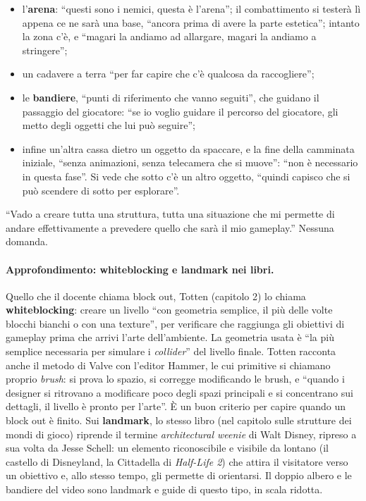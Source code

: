 \begin{itemize}
        spaccato, landmark ``importante per la resa estetica della scena'';
  \item l'\textbf{arena}: ``questi sono i nemici, questa è l'arena''; il combattimento si
        testerà lì appena ce ne sarà una base, ``ancora prima di avere la parte
        estetica''; intanto la zona c'è, e ``magari la andiamo ad allargare, magari la
        andiamo a stringere'';
  \item un cadavere a terra ``per far capire che c'è qualcosa da raccogliere'';
  \item le \textbf{bandiere}, ``punti di riferimento che vanno seguiti'', che guidano il
        passaggio del giocatore: ``se io voglio guidare il percorso del giocatore, gli
        metto degli oggetti che lui può seguire'';
  \item infine un'altra cassa dietro un oggetto da spaccare, e la fine della camminata
        iniziale, ``senza animazioni, senza telecamera che si muove'': ``non è necessario in
        questa fase''. Si vede che sotto c'è un altro oggetto, ``quindi capisco che si può
        scendere di sotto per esplorare''.
\end{itemize}
``Vado a creare tutta una struttura, tutta una situazione che mi permette di andare
effettivamente a prevedere quello che sarà il mio gameplay.'' Nessuna domanda.

\paragraph{Approfondimento: whiteblocking e landmark nei libri.} Quello che il docente
chiama block out, Totten (capitolo 2) lo chiama \textbf{whiteblocking}: creare un livello
``con geometria semplice, il più delle volte blocchi bianchi o con una texture'', per
verificare che raggiunga gli obiettivi di gameplay prima che arrivi l'arte
dell'ambiente. La geometria usata è ``la più semplice necessaria per simulare i
\emph{collider}'' del livello finale. Totten racconta anche il metodo di Valve con l'editor
Hammer, le cui primitive si chiamano proprio \emph{brush}: si prova lo spazio, si
corregge modificando le brush, e ``quando i designer si ritrovano a modificare poco degli
spazi principali e si concentrano sui dettagli, il livello è pronto per l'arte''. È un buon
criterio per capire quando un block out è finito. Sui \textbf{landmark}, lo stesso libro
(nel capitolo sulle strutture dei mondi di gioco) riprende il termine \emph{architectural
weenie} di Walt Disney, ripreso a sua volta da Jesse Schell: un elemento riconoscibile e
visibile da lontano (il castello di Disneyland, la Cittadella di \emph{Half-Life 2}) che
attira il visitatore verso un obiettivo e, allo stesso tempo, gli permette di orientarsi.
Il doppio albero e le bandiere del video sono landmark e guide di questo tipo, in scala
ridotta.

